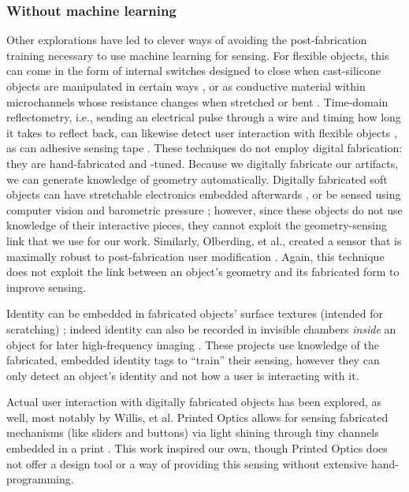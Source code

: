     \subsubsection{Without machine learning}
        Other explorations have led to clever ways of avoiding the post-fabrication training necessary to use machine learning for sensing. For flexible objects, this can come in the form of internal switches designed to close when cast-silicone objects are manipulated in certain ways \cite{slyper-structure}, or as conductive material within microchannels whose resistance changes when stretched or bent \cite{majidi-curvature, park-microchannels}. Time-domain reflectometry, i.e., sending an electrical pulse through a wire and timing how long it takes to reflect back, can likewise detect user interaction with flexible objects \cite{wimmer-tdr}, as can adhesive sensing tape \cite{holman-tactiletape}. These techniques do not employ digital fabrication: they are hand-fabricated and -tuned. Because we digitally fabricate our artifacts, we can generate knowledge of geometry automatically. Digitally fabricated soft objects can have stretchable electronics embedded afterwards \cite{yao-pneui}, or be sensed using computer vision and barometric pressure \cite{harrison-buttons, slyper-pressure}; however, since these objects do not use knowledge of their interactive pieces, they cannot exploit the geometry-sensing link that we use for our work. Similarly, Olberding, et al., created a sensor that is maximally robust to post-fabrication user modification \cite{olberding-cuttable}. Again, this technique does not exploit the link between an object's geometry and its fabricated form to improve sensing.

        Identity can be embedded in fabricated objects' surface textures (intended for scratching) \cite{harrison-acoustic}; indeed identity can also be recorded in invisible chambers \emph{inside} an object for later high-frequency imaging \cite{willis-infrastructs}. These projects use knowledge of the fabricated, embedded identity tags to ``train'' their sensing, however they can only detect an object's identity and not how a user is interacting with it.

        Actual user interaction with digitally fabricated objects has been explored, as well, most notably by Willis, et al. Printed Optics allows for sensing fabricated mechanisms (like sliders and buttons) via light shining through tiny channels embedded in a print \cite{willis-printedoptics}. This work inspired our own, though Printed Optics does not offer a design tool or a way of providing this sensing without extensive hand-programming.

